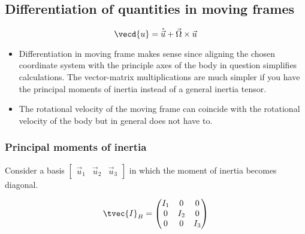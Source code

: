 \documentclass[10pt,a4paper]{scrartcl}
\begin{document}
\begin{multicols*}{2}

\subsection{Differentiation of quantities in moving frames}

\begin{equation*}
\vecd{u}=\mathring{\vec{u}}+\vec{\Omega}\times\vec{u}
\end{equation*}


\begin{itemize}
\item Differentiation in moving frame makes sense since aligning the chosen coordinate system with the principle axes of the body in question simplifies calculations. The vector-matrix multiplications are much simpler if you have the principal moments of inertia instead of a general inertia tensor.
\item The rotational velocity of the moving frame can coincide with the rotational velocity of the body but in general does not have to.
\end{itemize}

\subsubsection{Principal moments of inertia}

Consider a basis $\begin{bmatrix}\vec{u}_1&\vec{u}_2&\vec{u}_3\end{bmatrix}$ in which the moment of inertia becomes diagonal.

\begin{equation*}
\tvec{I}_B=\begin{pmatrix}
I_1&0&0\\0&I_2&0\\0&0&I_3
\end{pmatrix}
\end{equation*}


\end{multicols*}
\end{document}
